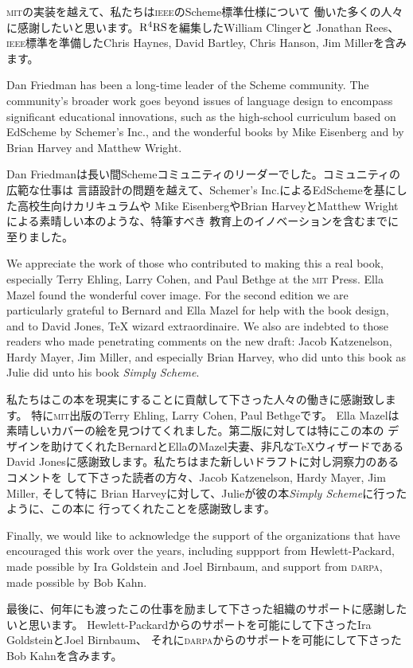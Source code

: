 \documentclass[oneside]{book}
\newcommand{\acronym}[1]{\textsc{\MakeLowercase{#1}}}
\begin{document}
\acronym{MIT}の実装を越えて、私たちは\acronym{IEEE}のScheme標準仕様について
働いた多くの人々に感謝したいと思います。\( \rm R^4RS \)を編集したWilliam Clingerと
Jonathan Rees、\acronym{IEEE}標準を準備したChris Haynes, David Bartley,
Chris Hanson, Jim Millerを含みます。

Dan Friedman has been a long-time leader of the Scheme community.  The
community's broader work goes beyond issues of language design to encompass
significant educational innovations, such as the high-school curriculum based
on EdScheme by Schemer's Inc., and the wonderful books by Mike Eisenberg and by
Brian Harvey and Matthew Wright.

Dan Friedmanは長い間Schemeコミュニティのリーダーでした。コミュニティの広範な仕事は
言語設計の問題を越えて、Schemer's Inc.によるEdSchemeを基にした高校生向けカリキュラムや
Mike EisenbergやBrian HarveyとMatthew Wrightによる素晴しい本のような、特筆すべき
教育上のイノベーションを含むまでに至りました。

We appreciate the work of those who contributed to making this a real book,
especially Terry Ehling, Larry Cohen, and Paul Bethge at the \acronym{MIT}
Press.  Ella Mazel found the wonderful cover image.  For the second edition we
are particularly grateful to Bernard and Ella Mazel for help with the book
design, and to David Jones, {\TeX} wizard extraordinaire.  We also are indebted
to those readers who made penetrating comments on the new draft: Jacob
Katzenelson, Hardy Mayer, Jim Miller, and especially Brian Harvey, who did unto
this book as Julie did unto his book \textit{Simply Scheme}.

私たちはこの本を現実にすることに貢献して下さった人々の働きに感謝致します。
特に\acronym{MIT}出版のTerry Ehling, Larry Cohen, Paul Bethgeです。
Ella Mazelは素晴しいカバーの絵を見つけてくれました。第二版に対しては特にこの本の
デザインを助けてくれたBernardとEllaのMazel夫妻、非凡な{\TeX}ウィザードである
David Jonesに感謝致します。私たちはまた新しいドラフトに対し洞察力のあるコメントを
して下さった読者の方々、Jacob Katzenelson, Hardy Mayer, Jim Miller, そして特に
Brian Harveyに対して、Julieが彼の本\textit{Simply Scheme}に行ったように、この本に
行ってくれたことを感謝致します。

Finally, we would like to acknowledge the support of the organizations that
have encouraged this work over the years, including suppport from
Hewlett-Packard, made possible by Ira Goldstein and Joel Birnbaum, and support
from \acronym{DARPA}, made possible by Bob Kahn.

最後に、何年にも渡ったこの仕事を励まして下さった組織のサポートに感謝したいと思います。
Hewlett-Packardからのサポートを可能にして下さったIra GoldsteinとJoel Birnbaum、
それに\acronym{DARPA}からのサポートを可能にして下さったBob Kahnを含みます。
\end{document}
